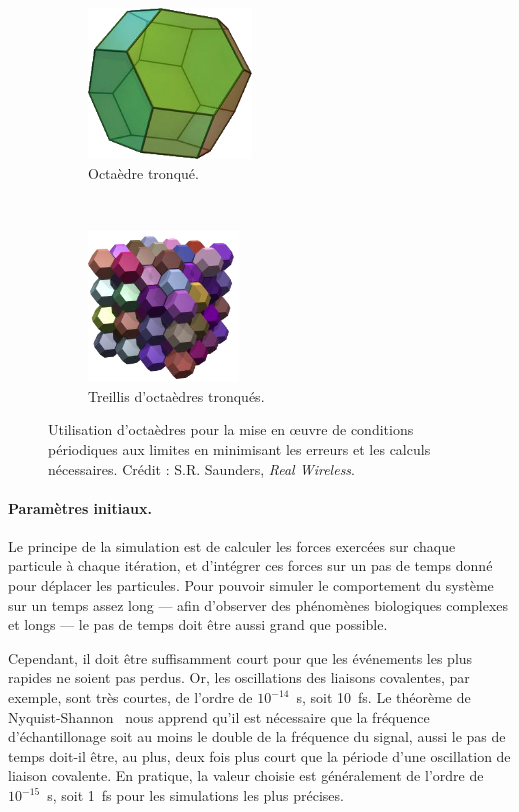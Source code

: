 	\begin{figure}[htb]
		\begin{subfigure}{.5\textwidth}
			\centering
			\includegraphics[height=4cm]{./figures/ch1/truncOctahedron}
			\caption{Octaèdre tronqué.}
			\label{fig:truncOctahedron}
		\end{subfigure}
		~
		\begin{subfigure}{.5\textwidth}
			\centering
			\includegraphics[height=4cm]{./figures/ch1/truncOctahedra}
			\caption{Treillis d'octaèdres tronqués.}
			\label{fig:truncOctahedra}
		\end{subfigure}
		\caption[Octaèdres pour les conditions périodiques aux limites.]{Utilisation d'octaèdres pour la mise en œuvre de conditions périodiques aux limites en minimisant les erreurs et les calculs nécessaires. Crédit : S.R. Saunders, \emph{Real Wireless}\footnotemark.}
		\label{fig:octa}
	\end{figure}
	
	
	\paragraph{Paramètres initiaux.} Le principe de la simulation est de calculer les forces exercées sur chaque particule à chaque itération, et d'intégrer ces forces sur un pas de temps donné pour déplacer les particules. Pour pouvoir simuler le comportement du système sur un temps assez long --- afin d'observer des phénomènes biologiques complexes et longs --- le pas de temps doit être aussi grand que possible.
	
	Cependant, il doit être suffisamment court pour que les événements les plus rapides ne soient pas perdus. Or, les oscillations des liaisons covalentes, par exemple, sont très courtes, de l'ordre de $10^{-14}$~s, soit 10~fs. Le théorème de Nyquist-Shannon~\cite{shannon1949communication} nous apprend qu'il est nécessaire que la fréquence d'échantillonage soit au moins le double de la fréquence du signal, aussi le pas de temps doit-il être, au plus, deux fois plus court que la période d'une oscillation de liaison covalente. En pratique, la valeur choisie est généralement de l'ordre de $10^{-15}$~s, soit 1~fs pour les simulations les plus précises.
	
